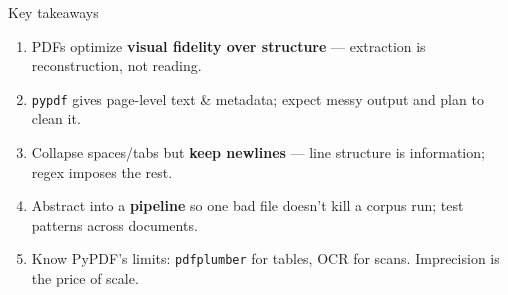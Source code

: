 \documentclass[9pt,aspectratio=169]{beamer}
\begin{document}
\begin{frame}{Key takeaways}
    \begin{enumerate}
        \item PDFs optimize \textbf{visual fidelity over structure} --- extraction is reconstruction, not reading.
        \item \texttt{pypdf} gives page-level text \& metadata; expect messy output and plan to clean it.
        \item Collapse spaces/tabs but \textbf{keep newlines} --- line structure is information; regex imposes the rest.
        \item Abstract into a \textbf{pipeline} so one bad file doesn't kill a corpus run; test patterns across documents.
        \item Know PyPDF's limits: \texttt{pdfplumber} for tables, OCR for scans. Imprecision is the price of scale.
    \end{enumerate}
    \vspace{1em}
\end{frame}
\end{document}
